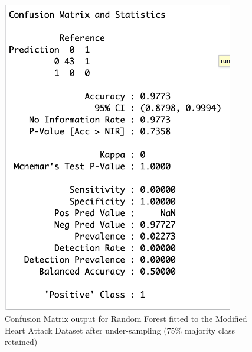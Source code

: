 \begin{figure}[!htbp]
    \centering
    \begin{minipage}{0.45\textwidth}
        \centering
        \includegraphics[width=0.9\textwidth]{ThesisTemplate/appendix/images/Chapter5Appendix/ConfusionMatrix75/ModifiedHA.png}
        \caption{Confusion Matrix output for Random Forest fitted to the Modified Heart Attack Dataset after under-sampling (75\% majority class retained)}
        \label{fig:my_label}
    \end{minipage}\hfill
    \begin{minipage}{0.45\textwidth}
        \centering

\end{minipage}
\end{figure}
